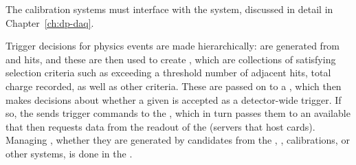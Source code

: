 
The calibration systems must interface with the   system, discussed in detail in Chapter~\ref{ch:dp-daq}. 

Trigger decisions for physics events are made %
hierarchically:  are generated from %
 and  hits, and these  are then used to create , which are collections of  satisfying selection criteria such as exceeding a threshold number of adjacent 
 hits, total 
charge recorded, as well as other criteria. These  are passed on to a , which then makes decisions about whether a given  is accepted as a detector-wide trigger.  If so, the  sends trigger commands to the , which in turn passes them to an available  that then requests data from the  readout of the  (servers that host  cards). Managing , whether they are generated by candidates from the , , calibrations, or other systems, is done in the . 

